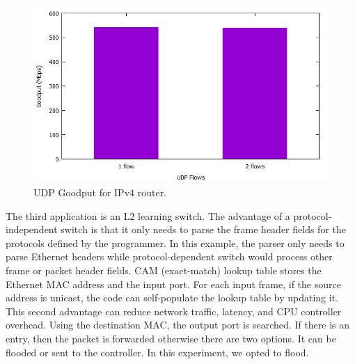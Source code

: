 \begin{figure}[htb]
\centering
\includegraphics[width=1.\linewidth]{figures/ipv4goodput.png}
\caption{UDP Goodput for IPv4 router.}
\label{fig:IPv4routerresult}
\end{figure}



The third application is an L2 learning switch.
The advantage of a protocol-independent switch is that it only needs to parse the frame header fields for the protocols defined by the programmer. In this example, the parser only needs to parse Ethernet headers while protocol-dependent switch would process other frame or packet header fields. CAM (exact-match) lookup table stores the Ethernet MAC address and the input port. 
For each input frame, if the source address is unicast, the code can self-populate the lookup table by updating it.
This second advantage can reduce network traffic, latency, and CPU controller overhead.
Using the destination MAC, the output port is searched.
If there is an entry, then the packet is forwarded otherwise there are two options. It can be flooded or sent to the controller. In this experiment, we opted to flood.


